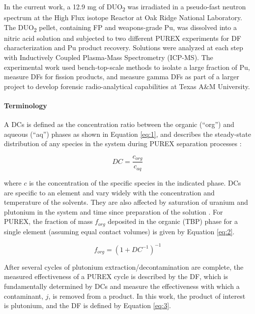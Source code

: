 \documentclass[review]{elsarticle}
\newcommand{\tsbs}{\textsubscript}
\begin{document}
 In the current work, a 12.9 mg of DUO\tsbs{2} 
 was irradiated in a pseudo-fast neutron spectrum at the High Flux isotope Reactor 
 at Oak Ridge National Laboratory. The DUO\tsbs{2} pellet, containing FP and weapons-grade
 Pu, was dissolved into a nitric acid solution and subjected to two different PUREX experiments
 for DF characterization and Pu product recovery.
 Solutions were analyzed at each step with Inductively Coupled Plasma-Mass Spectrometry (ICP-MS).
 The experimental work used bench-top-scale methods to isolate a large fraction of Pu,
 measure DFs for fission products, and measure gamma DFs as part of a larger project to 
 develop forensic radio-analytical capabilities at Texas A\&M University.
 
\paragraph{Terminology} A DCs is defined as the concentration ratio between the
 organic (“org”) and aqueous (“aq”) phases as shown in Equation \ref{eq:1},
 and describes the steady-state distribution of any species in the system during 
 PUREX separation processes \cite{benedict1982}:

 \begin{equation}\label{eq:1}
DC=\frac{c_{org}}{c_{aq}}
 \end{equation}
 
 where $c$ is the concentration of the specific species in the indicated phase. 
 DCs are specific to an element and vary widely with the concentration and
 temperature of the solvents. They are also affected by saturation of uranium
 and plutonium in the system and time since preparation of the solution 
 \cite{stoller1961,michael2010}. For PUREX, the fraction of mass
 $f_{org}$ deposited in the organic (TBP) phase for a single element 
 (assuming equal contact volumes) is given by Equation \ref{eq:2}.
 
\begin{equation}\label{eq:2}
f_{org}=(1+DC^{-1})^{-1}
\end{equation}
  
 After several cycles of plutonium extraction/decontamination are complete, 
 the measured effectiveness of a PUREX cycle is described by the DF, which is 
 fundamentally determined by DCs and measure the effectiveness with which a 
 contaminant, $j$, is removed from a product. In this work, the product of interest
 is plutonium, and the DF is defined by Equation \ref{eq:3}.
 
\end{document}
